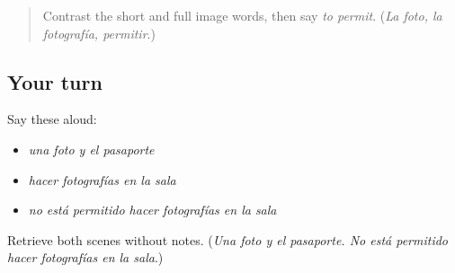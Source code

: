 \label{lesson:ES-C405-images-recall-2}



\begin{quote}
Contrast the short and full image words, then say \emph{to permit}. (\emph{La foto, la fotografía, permitir}.)
\end{quote}

\subsection*{Your turn}
Say these aloud:

\begin{itemize}
\raggedright
  \item \emph{una foto y el pasaporte}
  \item \emph{hacer fotografías en la sala}
  \item \emph{no está permitido hacer fotografías en la sala}
\end{itemize}

\begin{tcolorbox}[breakable,colback=teal!4,colframe=teal!35!black,title={Before you move on}]
Retrieve both scenes without notes. (\emph{Una foto y el pasaporte. No está permitido hacer fotografías en la sala}.)
\end{tcolorbox}
